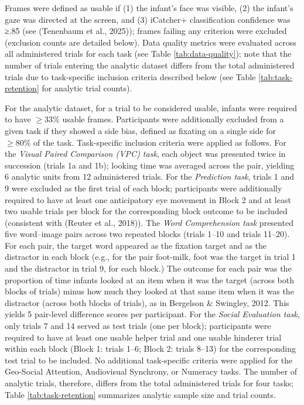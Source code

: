 \documentclass[
  english,
  man,floatsintext]{apa6}
\begin{document}
Frames were defined as usable if (1) the infant's face was visible, (2) the infant's gaze was directed at the screen, and (3) iCatcher+ classification confidence was ≥.85 (see (Tenenbaum et al., 2025)); frames failing any criterion were excluded (exclusion counts are detailed below).
Data quality metrics were evaluated across all administered trials for each task (see Table \ref{tab:data-quality}); note that the number of trials entering the analytic dataset differs from the total administered trials due to task-specific inclusion criteria described below (see Table \ref{tab:task-retention} for analytic trial counts).

For the analytic dataset, for a trial to be considered usable, infants were required to have \(\geq 33\%\) usable frames.
Participants were additionally excluded from a given task if they showed a side bias, defined as fixating on a single side for \(\geq 80\%\) of the task.
Task-specific inclusion criteria were applied as follows.
For the \emph{Visual Paired Comparison (VPC) task}, each object was presented twice in succession (trials 1a and 1b); looking time was averaged across the pair, yielding 6 analytic units from 12 administered trials.
For the \emph{Prediction task}, trials 1 and 9 were excluded as the first trial of each block; participants were additionally required to have at least one anticipatory eye movement in Block 2 and at least two usable trials per block for the corresponding block outcome to be included (consistent with (Reuter et al., 2018)).
The \emph{Word Comprehension task} presented five word--image pairs across two repeated blocks (trials 1--10 and trials 11--20).
For each pair, the target word appeared as the fixation target and as the distractor in each block (e.g., for the pair foot-milk, foot was the target in trial 1 and the distractor in trial 9, for each block.) The outcome for each pair was the proportion of time infants looked at an item when it was the target (across both blocks of trials) minus how much they looked at that same item when it was the distractor (across both blocks of trials), as in Bergelson \& Swingley, 2012.
This yields 5 pair-level difference scores per participant.
For the \emph{Social Evaluation task}, only trials 7 and 14 served as test trials (one per block); participants were required to have at least one usable helper trial and one usable hinderer trial within each block (Block 1: trials 1--6; Block 2: trials 8--13) for the corresponding test trial to be included.
No additional task-specific criteria were applied for the Geo-Social Attention, Audiovisual Synchrony, or Numeracy tasks.
The number of analytic trials, therefore, differs from the total administered trials for four tasks; Table \ref{tab:task-retention} summarizes analytic sample size and trial counts.
\end{document}
